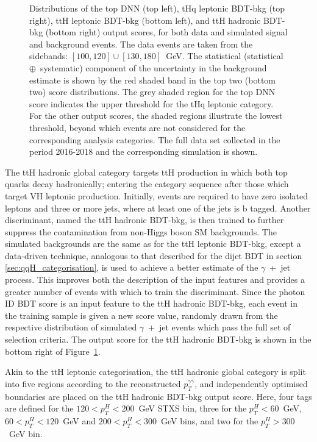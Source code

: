 \begin{figure}[htb!]
  \caption[Output scores of the discriminants used for the top-associated production mode categories]
  {
    Distributions of the top DNN (top left), tHq leptonic BDT-bkg (top right), ttH leptonic BDT-bkg (bottom left), and  ttH hadronic BDT-bkg (bottom right) output scores, for both data and simulated signal and background events. The data events are taken from the \mgg sidebands: $[100,120]\cup[130,180]$~GeV. The statistical (statistical~$\oplus$~systematic) component of the uncertainty in the background estimate is shown by the red shaded band in the top two (bottom two) score distributions. The grey shaded region for the top DNN score indicates the upper threshold for the tHq leptonic category. For the other output scores, the shaded regions illustrate the lowest threshold, beyond which events are not considered for the corresponding analysis categories. The full data set collected in the period 2016-2018 and the corresponding simulation is shown.
  }
  \label{fig:categorisation_top}
\end{figure}

The ttH hadronic global category targets ttH production in which both top quarks decay hadronically; entering the category sequence after those which target VH leptonic production. Initially, events are required to have zero isolated leptons and three or more jets, where at least one of the jets is b tagged. Another discriminant, named the ttH hadronic BDT-bkg, is then trained to further suppress the contamination from non-Higgs boson SM backgrounds. The simulated backgrounds are the same as for the ttH leptonic BDT-bkg, except a data-driven technique, analogous to that described for the dijet BDT in section \ref{sec:qqH_categorisation}, is used to achieve a better estimate of the $\gamma$~+~jet process. This improves both the description of the input features and provides a greater number of events with which to train the discriminant. Since the photon ID BDT score is an input feature to the ttH hadronic BDT-bkg, each event in the training sample is given a new score value, randomly drawn from the respective distribution of simulated $\gamma$~+~jet events which pass the full set of selection criteria. The output score for the ttH hadronic BDT-bkg is shown in the bottom right of Figure~\ref{fig:categorisation_top}.

Akin to the ttH leptonic categorisation, the ttH hadronic global category is split into five regions according to the reconstructed $p_T^{\gamma\gamma}$, and independently optimised boundaries are placed on the ttH hadronic BDT-bkg output score. Here, four tags are defined for the $120<p_T^H<200$~GeV STXS bin, three for the $p_T^H<60$~GeV, $60<p_T^H<120$~GeV and $200<p_T^H<300$~GeV bins, and two for the $p_T^H>300$~GeV bin. 

